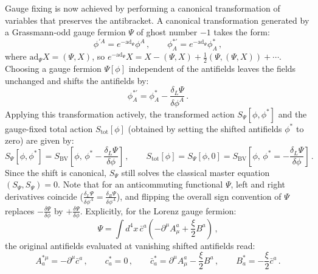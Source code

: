 Gauge fixing is now achieved by performing a canonical transformation of variables that preserves the antibracket. A canonical transformation generated by a Grassmann-odd gauge fermion \(\Psi\) of ghost number \(-1\) takes the form:
\begin{equation} \label{eq:bv_canonical_transform}
    \phi^{\prime A} = e^{-\text{ad}_\Psi} \phi^A \, , \qquad \phi_A^{*\prime} = e^{-\text{ad}_\Psi} \phi_A^* \, ,
\end{equation}
where \(\text{ad}_\Psi X = (\Psi, X)\), so \(e^{-\text{ad}_\Psi} X = X - (\Psi, X) + \frac{1}{2}(\Psi, (\Psi, X)) + \cdots\). Choosing a gauge fermion \(\Psi[\phi]\) independent of the antifields leaves the fields unchanged and shifts the antifields by:
\begin{equation} \label{eq:bv_antifield_shift}
    \phi_A^{*\prime} = \phi_A^* - \frac{\delta_L \Psi}{\delta \phi^A} \, .
\end{equation}
Applying this transformation actively, the transformed action \(S_\Psi[\phi, \phi^*]\) and the gauge-fixed total action \(S_{\text{tot}}[\phi]\) (obtained by setting the shifted antifields \(\phi^*\) to zero) are given by:
\begin{equation} \label{eq:bv_gauge_fixing_prescription}
    S_\Psi[\phi, \phi^*] = S_{\text{BV}}\left[ \phi, \, \phi^* - \frac{\delta_L \Psi}{\delta \phi} \right] \, , \qquad \boxed{S_{\text{tot}}[\phi] = S_\Psi[\phi, 0] = S_{\text{BV}}\left[ \phi, \, \phi^* = -\frac{\delta_L \Psi}{\delta \phi} \right]} \, .
\end{equation}
Since the shift is canonical, \(S_\Psi\) still solves the classical master equation \((S_\Psi, S_\Psi) = 0\). Note that for an anticommuting functional \(\Psi\), left and right derivatives coincide (\(\frac{\delta_L \Psi}{\delta \phi^A} = \frac{\delta_R \Psi}{\delta \phi^A}\)), and flipping the overall sign convention of \(\Psi\) replaces \(-\frac{\delta \Psi}{\delta \phi}\) by \(+\frac{\delta \Psi}{\delta \phi}\). Explicitly, for the Lorenz gauge fermion:
\begin{equation} \label{eq:bv_example_gauge_fermion}
    \Psi = \int d^4x \, \bar{c}^a \left( -\partial^\mu A_\mu^a + \frac{\xi}{2} B^a \right) \, ,
\end{equation}
the original antifields evaluated at vanishing shifted antifields read:
\begin{equation} \label{eq:bv_antifield_evaluations}
    A_a^{*\mu} = -\partial^\mu \bar{c}^a \, , \qquad c_a^* = 0 \, , \qquad \bar{c}_a^* = \partial^\mu A_\mu^a - \frac{\xi}{2} B^a \, , \qquad B_a^* = -\frac{\xi}{2} \bar{c}^a \, .
\end{equation}
